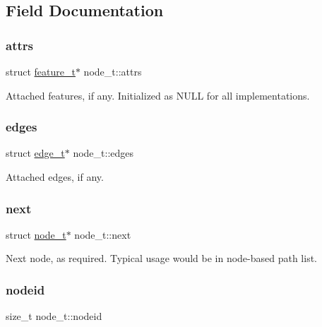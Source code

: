 \subsection{Field Documentation}
\mbox{\label{structnode__t_a6d2c8715312b206eab73c385d58870e5}} 
\subsubsection{\texorpdfstring{attrs}{attrs}}
{\footnotesize\ttfamily struct \hyperlink{structfeature__t}{feature\+\_\+t}$\ast$ node\+\_\+t\+::attrs}

Attached features, if any. Initialized as N\+U\+LL for all implementations. \mbox{\label{structnode__t_a8d25d828a2823867dec243aee51835cb}} 
\subsubsection{\texorpdfstring{edges}{edges}}
{\footnotesize\ttfamily struct \hyperlink{structedge__t}{edge\+\_\+t}$\ast$ node\+\_\+t\+::edges}

Attached edges, if any. \mbox{\label{structnode__t_aca548c9bafe54ba9db19d40a7a7f1cb3}} 
\subsubsection{\texorpdfstring{next}{next}}
{\footnotesize\ttfamily struct \hyperlink{structnode__t}{node\+\_\+t}$\ast$ node\+\_\+t\+::next}



Next node, as required. Typical usage would be in node-\/based path list. 

\mbox{\label{structnode__t_a3fe17f2fd1e7a7b2ec5f7bfae826816c}} 
\subsubsection{\texorpdfstring{nodeid}{nodeid}}
{\footnotesize\ttfamily size\+\_\+t node\+\_\+t\+::nodeid}


